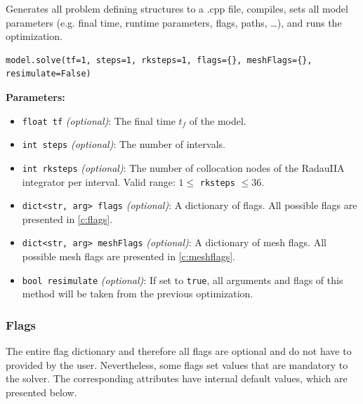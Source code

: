 \documentclass[12pt]{article}
\begin{document}
\begin{mdframed}[backgroundcolor=gray!10, roundcorner=10pt,
		linewidth=1pt]

	Generates all problem defining structures to a .cpp file, compiles,
	sets all model parameters (e.g. final time, runtime parameters, flags,
	paths, \ldots), and runs the optimization.

	\begin{lstlisting}
model.solve(tf=1, steps=1, rksteps=1, flags={}, meshFlags={}, resimulate=False)
	\end{lstlisting}
	\label{solve}
	\textbf{Parameters:}
	\begin{itemize}
		\item \texttt{float tf} \emph{(optional)}: The final time $t_f$
		      of the model.
		\item \texttt{int steps} \emph{(optional)}: The number of
		      intervals.
		\item \texttt{int rksteps} \emph{(optional)}: The number of
		      collocation nodes of the RadauIIA integrator per interval. Valid range: $1
			      \leq$ \texttt{rksteps} $\leq 36$.
		\item \texttt{dict<str, arg> flags} \emph{(optional)}: A
		      dictionary of flags. All possible flags are presented in \eqref{c:flags}.
		\item \texttt{dict<str, arg> meshFlags} \emph{(optional)}: A
		      dictionary of mesh flags. All possible mesh flags are presented in
		      \eqref{c:meshflags}.
		\item \texttt{bool resimulate} \emph{(optional)}: If set to
		      \texttt{true}, all arguments and flags of this method will be taken from the
		      previous optimization.
	\end{itemize}

\end{mdframed}

\subsubsection{Flags}
\label{c:flags}

The entire flag dictionary and therefore all flags are optional and do not have
to provided by the user. Nevertheless, some flags set values that are mandatory
to the solver. The corresponding attributes have internal default values, which
are presented below.
\end{document}
